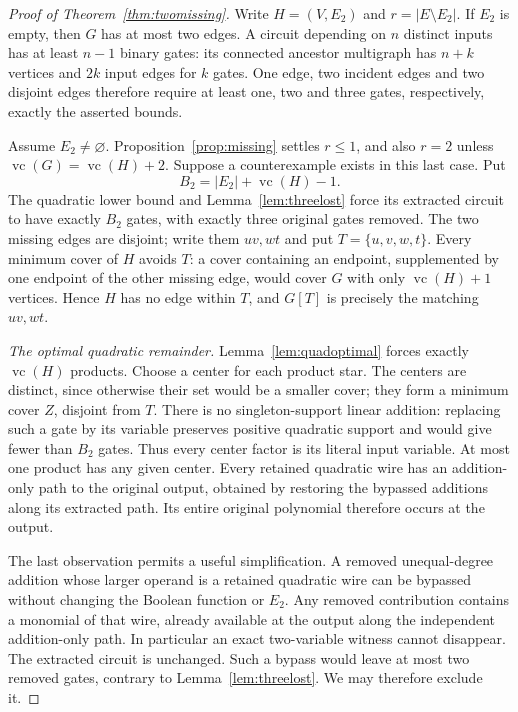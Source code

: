 \documentclass[11pt]{article}
\newcommand{\vc}{\operatorname{vc}}
\theoremstyle{definition}
\theoremstyle{remark}
\begin{document}
\begin{proof}[Proof of Theorem~\ref{thm:twomissing}]
Write $H=(V,E_2)$ and $r=|E\setminus E_2|$. If $E_2$ is empty, then $G$ has at most two edges. A circuit depending on $n$ distinct inputs has at least $n-1$ binary gates: its connected ancestor multigraph has $n+k$ vertices and $2k$ input edges for $k$ gates. One edge, two incident edges and two disjoint edges therefore require at least one, two and three gates, respectively, exactly the asserted bounds.

Assume $E_2\ne\varnothing$. Proposition~\ref{prop:missing} settles $r\le1$, and also $r=2$ unless $\vc(G)=\vc(H)+2$. Suppose a counterexample exists in this last case. Put
\[
 B_2=|E_2|+\vc(H)-1.
\]
The quadratic lower bound and Lemma~\ref{lem:threelost} force its extracted circuit to have exactly $B_2$ gates, with exactly three original gates removed. The two missing edges are disjoint; write them $uv,wt$ and put $T=\{u,v,w,t\}$. Every minimum cover of $H$ avoids $T$: a cover containing an endpoint, supplemented by one endpoint of the other missing edge, would cover $G$ with only $\vc(H)+1$ vertices. Hence $H$ has no edge within $T$, and $G[T]$ is precisely the matching $uv,wt$.

\emph{The optimal quadratic remainder.} Lemma~\ref{lem:quadoptimal} forces exactly $\vc(H)$ products. Choose a center for each product star. The centers are distinct, since otherwise their set would be a smaller cover; they form a minimum cover $Z$, disjoint from $T$. There is no singleton-support linear addition: replacing such a gate by its variable preserves positive quadratic support and would give fewer than $B_2$ gates. Thus every center factor is its literal input variable. At most one product has any given center. Every retained quadratic wire has an addition-only path to the original output, obtained by restoring the bypassed additions along its extracted path. Its entire original polynomial therefore occurs at the output.

The last observation permits a useful simplification. A removed unequal-degree addition whose larger operand is a retained quadratic wire can be bypassed without changing the Boolean function or $E_2$. Any removed contribution contains a monomial of that wire, already available at the output along the independent addition-only path. In particular an exact two-variable witness cannot disappear. The extracted circuit is unchanged. Such a bypass would leave at most two removed gates, contrary to Lemma~\ref{lem:threelost}. We may therefore exclude it.


\end{proof}
\end{document}
